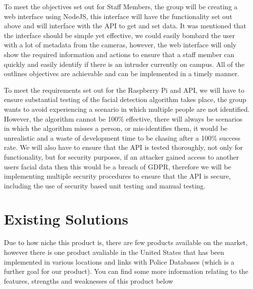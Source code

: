 \documentclass[
  english,
  a4paper,
,tablecaptionabove
]{scrartcl}
\begin{document}
To meet the objectives set out for Staff Members, the group will be
creating a web interface using NodeJS, this interface will have the
functionality set out above and will interface with the API to get and
set data. It was mentioned that the interface should be simple yet
effective, we could easily bombard the user with a lot of metadata from
the cameras, however, the web interface will only show the required
information and actions to ensure that a staff member can quickly and
easily identify if there is an intruder currently on campus. All of the
outlines objectives are achievable and can be implemented in a timely
manner.

To meet the requirements set out for the Raspberry Pi and API, we will
have to ensure substantial testing of the facial detection algorithm
takes place, the group wants to avoid experiencing a scenario in which
multiple people are not identified. However, the algorithm cannot be
100\% effective, there will always be scenarios in which the algorithm
misses a person, or mis-identifies them, it would be unrealistic and a
waste of development time to be chasing after a 100\% success rate. We
will also have to ensure that the API is tested thoroughly, not only for
functionality, but for security purposes, if an attacker gained access
to another users facial data then this would be a breach of GDPR,
therefore we will be implementing multiple security procedures to ensure
that the API is secure, including the use of security based unit testing
and manual testing.

\newpage

\hypertarget{existing-solutions}{%
\section{Existing Solutions}\label{existing-solutions}}

Due to how niche this product is, there are few products available on
the market, however there is one product avaliable in the United States
that has been implemented in various locations and links with Police
Databases (which is a further goal for our product). You can find some
more information relating to the features, strengths and weaknesses of
this product below
\end{document}
